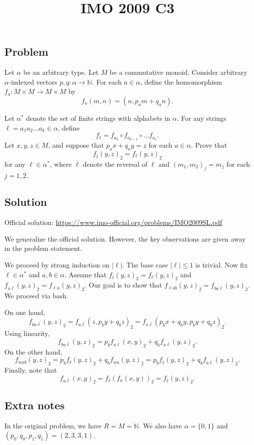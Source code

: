 \documentclass{article}
\title{IMO 2009 C3}
\author{}
\date{}
\newcommand{\N}{\mathbb{N}}
\begin{document}
\maketitle



\subsection*{Problem}

Let $\alpha$ be an arbitrary type.
Let $M$ be a commutative monoid.
Consider arbitrary $\alpha$-indexed vectors $p, q : \alpha \to \N$.
For each $a \in \alpha$, define the homomorphism $f_a : M \times M \to M \times M$ by
\[ f_a(m, n) = (n, p_a m + q_a n). \]

Let $\alpha^*$ denote the set of finite strings with alphabets in $\alpha$.
For any strings $\ell = a_1 a_2 \ldots a_k \in \alpha$, define
\[ f_{\ell} = f_{a_k} \circ f_{a_{k - 1}} \circ \ldots f_{a_1}. \]
Let $x, y, z \in M$, and suppose that $p_a x + q_a y = z$ for each $a \in \alpha$.
Prove that
\[ f_{\overline{\ell}}(y, z)_2 = f_{\ell}(y, z)_2 \]
    for any $\ell \in \alpha^*$, where $\overline{\ell}$ denote the reversal of $\ell$ and $(m_1, m_2)_j = m_j$ for each $j = 1, 2$.



\subsection*{Solution}

Official solution: \url{https://www.imo-official.org/problems/IMO2009SL.pdf}

We generalize the official solution.
However, the key observations are given away in the problem statement.

We proceed by strong induction on $|\ell|$.
The base case $|\ell| \leq 1$ is trivial.
Now fix $\ell \in \alpha^*$ and $a, b \in \alpha$.
Assume that $f_{\overline{\ell}}(y, z)_2 = f_{\ell}(y, z)_2$ and $f_{a \overline{\ell}}(y, z)_2 = f_{\ell \alpha}(y, z)_2$.
Our goal is to show that $f_{\ell ab}(y, z)_2 = f_{ba \overline{\ell}}(y, z)_2$.
We proceed via bash.

On one hand,
\[ f_{ba \overline{\ell}}(y, z)_2 = f_{a \overline{\ell}}(z, p_b y + q_b z)_2
    = f_{a \overline{\ell}}(p_b x + q_b y, p_b y + q_b z)_2. \]
Using linearity,
\[ f_{ba \overline{\ell}}(y, z)_2 = p_b f_{a \overline{\ell}}(x, y)_2 + q_b f_{a \overline{\ell}}(y, z)_2. \]
On the other hand,
\[ f_{w a b}(y, z)_2 = p_b f_{\ell}(y, z)_2 + q_b f_{w a}(y, z)_2
    = p_b f_{\overline{\ell}}(y, z)_2 + q_b f_{a \overline{\ell}}(y, z)_2. \]
Finally, note that
\[ f_{a \overline{\ell}}(x, y)_2 = f_{\overline{\ell}}(f_{a}(x, y))_2 = f_{\overline{\ell}}(y, z)_2. \]



\subsection*{Extra notes}

In the original problem, we have $R = M = \N$.
We also have $\alpha = \{0, 1\}$ and $(p_0, q_0, p_1, q_1) = (2, 3, 3, 1)$.
\end{document}
